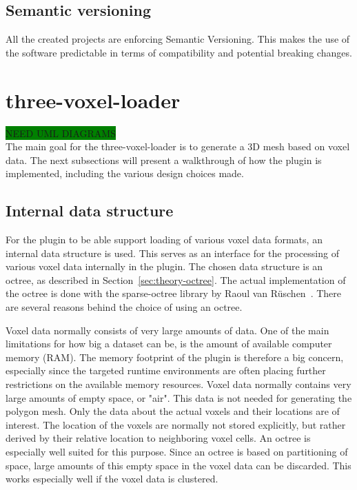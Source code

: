 \subsection{Semantic versioning}
All the created projects are enforcing Semantic Versioning. This makes the use of the software predictable in terms of compatibility and potential breaking changes.

\section{three-voxel-loader}
\colorbox{green}{NEED UML DIAGRAMS}\\
The main goal for the three-voxel-loader is to generate a 3D mesh based on voxel data. The next subsections will present a walkthrough of how the plugin is implemented, including the various design choices made.

\subsection{Internal data structure}
For the plugin to be able support loading of various voxel data formats, an internal data structure is used. This serves as an interface for the processing of various voxel data internally in the plugin. The chosen data structure is an octree, as described in Section~\ref{sec:theory-octree}. The actual implementation of the octree is done with the sparse-octree library by Raoul van R\"uschen~\cite{sparse-octree}. There are several reasons behind the choice of using an octree. 

Voxel data normally consists of very large amounts of data. One of the main limitations for how big a dataset can be, is the amount of available computer memory (RAM). The memory footprint of the plugin is therefore a big concern, especially since the targeted runtime environments are often placing further restrictions on the available memory resources. Voxel data normally contains very large amounts of empty space, or "air". This data is not needed for generating the polygon mesh. Only the data about the actual voxels and their locations are of interest. The location of the voxels are normally not stored explicitly, but rather derived by their relative location to neighboring voxel cells. An octree is especially well suited for this purpose. Since an octree is based on partitioning of space, large amounts of this empty space in the voxel data can be discarded. This works especially well if the voxel data is clustered.

